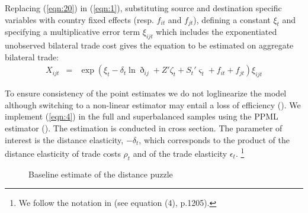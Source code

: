 \documentclass[12pt,twoside,a4paper,notitlepage]{article}
\begin{document}
Replacing (\ref{eqn:20}) in (\ref{eqn:1}), substituting source and destination specific variables with country fixed effects (resp.
$f_{it}$ and $f_{jt}$), defining a constant $\xi_t$ and specifying a multiplicative error term $\xi_{ijt}$ which includes the exponentiated unobserved bilateral trade cost gives the equation to be estimated on aggregate bilateral trade: 
\begin{eqnarray}
X_{ijt}&=&\exp{\left(\xi_t-\delta_{t}\ln{\eth_{ij}}+{Z}'\zeta_t+{S_t}'\varsigma_t+f_{it}+f_{jt}\right)\xi_{ijt}} \label{eqn:4}
\end{eqnarray}


To ensure consistency of the point estimates we do not loglinearize the model although switching to a non-linear estimator may entail a loss of efficiency (\cite{Manning1999}).
We implement (\ref{eqn:4}) in the full and superbalanced samples using the PPML estimator (\cite{SantosSilva2006}).
The estimation is conducted in cross section.
The parameter of interest is the distance elasticity, $-\delta_t$, which corresponds to the product of the distance elasticity of trade costs $\rho_t$ and of the trade elasticity $\epsilon_t$.
\footnote{We follow the notation in \cite{Head2013} (see equation (4), p.1205).}


\begin{figure}[h!]
	\caption{Baseline estimate of the distance puzzle \label{fig:DP_baseline}}
	\begin{center}
		\setlength{\fboxrule}{1pt} %
		\setlength{\fboxsep}{.1in} %
	\end{center}
\end{figure}
\end{document}
